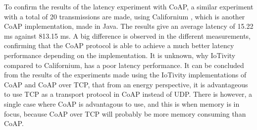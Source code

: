 To confirm the results of the latency experiment with CoAP, a similar experiment with a total of 20 transmissions are made, using Californium \cite{Calif82:online}, which is another CoAP implementation, made in Java. The results give an average latency of 15.22 ms against 813.15 ms. 
A big difference is observed in the different measurements, confirming that the CoAP protocol is able to achieve a much better latency performance depending on the implementation. It is unknown, why IoTivity compared to Californium, has a poor latency performance.
It can be concluded from the results of the experiments made using the IoTivity implementations of CoAP and CoAP over TCP, that from an energy perspective, it is advantageous to use TCP as a transport protocol in CoAP instead of UDP.
There is however, a single case where CoAP is advantagous to use, and this is when memory is in focus, because CoAP over TCP will probably be more memory consuming than CoAP.  




%
%



	




